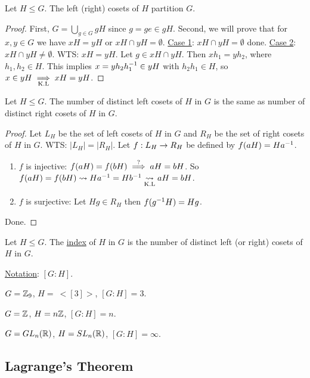 \documentclass[]{article}
\begin{document}
\begin{theorem}
	Let $H\leq G$. The left (right) cosets of $H$ partition $G$.
\end{theorem}
\begin{proof}
	First, $G = \bigcup_{g\in G} gH$ since $g = ge\in gH$.
	Second, we will prove that for $x,y\in G$ we have $xH = yH$ or $xH\cap yH = \emptyset$.
	\ul{Case 1}: $xH\cap yH = \emptyset$ done.
	\ul{Case 2}: $xH\cap yH \neq \emptyset$. WTS: $xH = yH$.
	Let $g\in xH\cap yH$. Then $xh_1 = yh_2$, where $h_1,h_2\in H$.
	This implies $x = y h_2 h_1^{-1}\in yH$ with $h_2 h_1\in H$, so $x\in yH \underset{\text{K.L}}{\implies} xH = yH$.
\end{proof}

\begin{theorem}
	Let $H\leq G$. The number of distinct left cosets of $H$ in $G$ is the same as number of distinct right cosets of $H$ in $G$.
\end{theorem}
\begin{proof}
	Let $L_H$ be the set of left cosets of $H$ in $G$ and $R_H$ be the set of right cosets of $H$ in $G$.
	WTS: $|L_H| = |R_H|$.
	Let $f: L_H\rightarrow R_H$ be defined by $f(aH) = Ha^{-1}$.
	\begin{enumerate}
		\item $f$ is injective: $f(aH) = f(bH) \overset{?}{\implies} aH = bH$. So $f(aH) = f(bH) \rightsquigarrow Ha^{-1} = Hb^{-1} \underset{\text{K.L}}{\rightsquigarrow} aH = bH$.
		\item $f$ is surjective: Let $Hg\in R_H$ then $f(g^{-1} H) = Hg$.
	\end{enumerate}
	Done.
\end{proof}

\begin{definition}
	Let $H\leq G$. The \ul{index} of $H$ in $G$ is the number of distinct left (or right) cosets of $H$ in $G$.
\end{definition}
\ul{Notation}: $[G:H]$.
\begin{example}
	$G = \mathbb{Z}_9$, $H =\ <[3]>$, $[G:H] = 3$.
\end{example}
\begin{example}
	$G = \mathbb{Z}$, $H = n\mathbb{Z}$, $[G:H] = n$.
\end{example}
\begin{example}
	$G = GL_n(\mathbb{R})$, $H = SL_n(\mathbb{R})$, $[G:H] = \infty$.
\end{example}

\subsection{Lagrange's Theorem}
\end{document}
